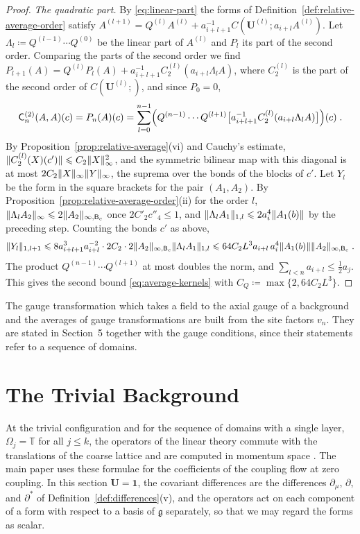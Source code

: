 \documentclass[11pt]{preprint}
\makeatletter
\newcommand{\id}{\mathbf 1}
\DeclarePairedDelimiter{\norm}{\lVert}{\rVert}
\newcommand*{\bigcdot}{}%
\DeclareRobustCommand*{\bigcdot}{%
	\mathbin{\mathpalette\bigcdot@{}}%
}
\newcommand*{\bigcdot@scalefactor}{.7}
\newcommand*{\bigcdot@widthfactor}{1.15}
\newcommand*{\bigcdot@}[2]{%
	\sbox0{$#1\vcenter{}$}%
	\sbox2{$#1\cdot\m@th$}%
	\hbox to \bigcdot@widthfactor\wd2{%
		\hss
		\raise\ht0\hbox{%
			\scalebox{\bigcdot@scalefactor}{%
				\lower\ht0\hbox{$#1\bullet\m@th$}%
			}%
		}%
		\hss
	}%
}
\numberwithin{equation}{section}
\makeatother
\begin{document}
\begin{proof}
\emph{The quadratic part.} By \eqref{eq:linear-part} the forms of Definition~\ref{def:relative-average-order} satisfy $A^{(l+1)} = Q^{(l)}A^{(l)} + a_{i+l+1}^{-1}C(\mathbf U^{(l)}; a_{i+l}A^{(l)})$. Let $\Lambda_l \coloneqq Q^{(l-1)}\cdots Q^{(0)}$ be the linear part of $A^{(l)}$ and $P_l$ its part of the second order. Comparing the parts of the second order we find $P_{l+1}(A) = Q^{(l)}P_l(A) + a_{i+l+1}^{-1}C^{(l)}_2(a_{i+l}\Lambda_lA)$, where $C^{(l)}_2$ is the part of the second order of $C(\mathbf U^{(l)}; \bigcdot)$, and since $P_0 = 0$,
\[
    \mathsf C^{(2)}_n(A, A)(c) = P_n(A)(c) = \sum_{l=0}^{n-1}\Bigl(Q^{(n-1)}\cdots Q^{(l+1)}\bigl[a_{i+l+1}^{-1}C^{(l)}_2(a_{i+l}\Lambda_lA)\bigr]\Bigr)(c)\;.
\]
By Proposition~\ref{prop:relative-average}(vi) and Cauchy's estimate, $\norm{C^{(l)}_2(X)(c')} \leqslant C_2\norm X_\infty^2$, and the symmetric bilinear map with this diagonal is at most $2C_2\norm X_\infty\norm Y_\infty$, the suprema over the bonds of the blocks of $c'$. Let $Y_l$ be the form in the square brackets for the pair $(A_1, A_2)$. By Proposition~\ref{prop:relative-average-order}(ii) for the order $l$, $\norm{\Lambda_lA_2}_\infty \leqslant 2\norm{A_2}_{\infty,\mathsf B_c}$ once $2C'_2c''_4 \leqslant 1$, and $\norm{\Lambda_lA_1}_{1,l} \leqslant 2a_i^4\norm{A_1(b)}$ by the preceding step. Counting the bonds $c'$ as above,
\[
    \norm{Y_l}_{1,l+1} \leqslant 8a_{i+l+1}^3a_{i+l}^{-2}\cdot2C_2\cdot2\norm{A_2}_{\infty,\mathsf B_c}\norm{\Lambda_lA_1}_{1,l} \leqslant 64C_2L^3a_{i+l}\,a_i^4\norm{A_1(b)}\norm{A_2}_{\infty,\mathsf B_c}\;.
\]
The product $Q^{(n-1)}\cdots Q^{(l+1)}$ at most doubles the norm, and $\sum_{l<n}a_{i+l} \leqslant \frac{1}{2}a_j$. This gives the second bound \eqref{eq:average-kernels} with $C_Q \coloneqq \max\{ 2, 64C_2L^3 \}$.
\end{proof}

The gauge transformation which takes a field to the axial gauge of a background \cite[(106), p.~33]{BalabanAVG} and the averages of gauge transformations \cite[Sect.~F]{BalabanAVG} are built from the site factors $v_n$. They are stated in Section~5 together with the gauge conditions, since their statements refer to a sequence of domains.

\section{The Trivial Background}\label{sec:trivial-background}

At the trivial configuration and for the sequence of domains with a single layer, $\Omega_j = \mathbb T$ for all $j \leqslant k$, the operators of the linear theory commute with the translations of the coarse lattice and are computed in momentum space \cite[Sects.~B--D]{BalabanPRT1}. The main paper uses these formulae for the coefficients of the coupling flow at zero coupling. In this section $\mathbf U = \id$, the covariant differences are the differences $\partial_\mu$, $\partial$, and $\partial^*$ of Definition~\ref{def:differences}(v), and the operators act on each component of a form with respect to a basis of $\mathfrak g$ separately, so that we may regard the forms as scalar.
\end{document}
